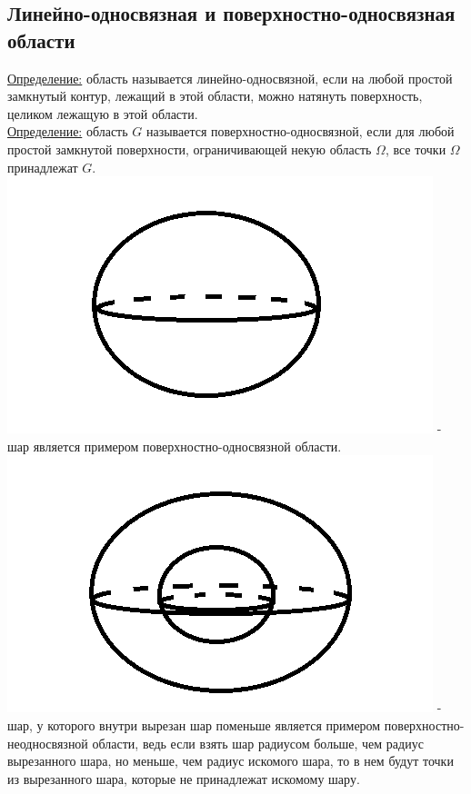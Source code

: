 \documentclass[12pt]{article}
\begin{document}
\subsection{Линейно-односвязная и поверхностно-односвязная области}
\uline{Определение:} область называется линейно-односвязной, если на любой простой замкнутый контур, лежащий в этой области, можно натянуть поверхность, целиком лежащую в этой области.\\
\uline{Определение:} область $G$ называется поверхностно-односвязной, если для любой простой замкнутой поверхности, ограничивающей некую область $\Omega$, все точки $\Omega$ принадлежат $G$.\\
\includegraphics{surfaceSingleConnected1} - шар является примером поверхностно-односвязной области.\\
\includegraphics{surfaceNotSingleConnected1} - шар, у которого внутри вырезан шар поменьше является примером поверхностно-неодносвязной области, ведь если взять шар радиусом больше, чем радиус вырезанного шара, но меньше, чем радиус искомого шара, то в нем будут точки из вырезанного шара, которые не принадлежат искомому шару.\\
\end{document}
